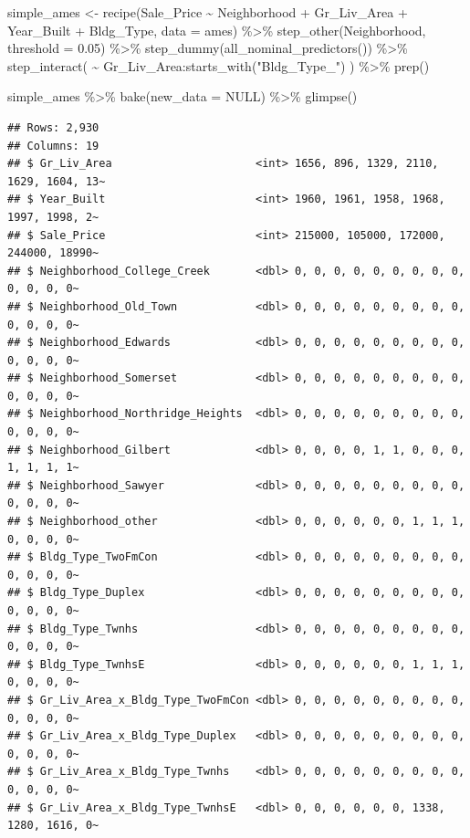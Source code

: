 \documentclass[
]{book}
\newenvironment{Shaded}{\begin{snugshade}}{\end{snugshade}}
\newcommand{\AttributeTok}[1]{\textcolor[rgb]{0.77,0.63,0.00}{#1}}
\newcommand{\ConstantTok}[1]{\textcolor[rgb]{0.00,0.00,0.00}{#1}}
\newcommand{\FloatTok}[1]{\textcolor[rgb]{0.00,0.00,0.81}{#1}}
\newcommand{\FunctionTok}[1]{\textcolor[rgb]{0.00,0.00,0.00}{#1}}
\newcommand{\NormalTok}[1]{#1}
\newcommand{\OtherTok}[1]{\textcolor[rgb]{0.56,0.35,0.01}{#1}}
\newcommand{\SpecialCharTok}[1]{\textcolor[rgb]{0.00,0.00,0.00}{#1}}
\newcommand{\StringTok}[1]{\textcolor[rgb]{0.31,0.60,0.02}{#1}}
\begin{document}
\begin{Shaded}
\begin{Highlighting}[]
\NormalTok{simple\_ames }\OtherTok{\textless{}{-}} \FunctionTok{recipe}\NormalTok{(Sale\_Price }\SpecialCharTok{\textasciitilde{}}\NormalTok{ Neighborhood }\SpecialCharTok{+}\NormalTok{ Gr\_Liv\_Area }\SpecialCharTok{+}\NormalTok{ Year\_Built }\SpecialCharTok{+}\NormalTok{ Bldg\_Type,}
         \AttributeTok{data =}\NormalTok{ ames) }\SpecialCharTok{\%\textgreater{}\%}
  \FunctionTok{step\_other}\NormalTok{(Neighborhood, }\AttributeTok{threshold =} \FloatTok{0.05}\NormalTok{) }\SpecialCharTok{\%\textgreater{}\%} 
  \FunctionTok{step\_dummy}\NormalTok{(}\FunctionTok{all\_nominal\_predictors}\NormalTok{()) }\SpecialCharTok{\%\textgreater{}\%} 
  \FunctionTok{step\_interact}\NormalTok{( }\SpecialCharTok{\textasciitilde{}}\NormalTok{ Gr\_Liv\_Area}\SpecialCharTok{:}\FunctionTok{starts\_with}\NormalTok{(}\StringTok{"Bldg\_Type\_"}\NormalTok{) ) }\SpecialCharTok{\%\textgreater{}\%} 
  \FunctionTok{prep}\NormalTok{()}

\NormalTok{simple\_ames }\SpecialCharTok{\%\textgreater{}\%} \FunctionTok{bake}\NormalTok{(}\AttributeTok{new\_data =} \ConstantTok{NULL}\NormalTok{) }\SpecialCharTok{\%\textgreater{}\%} \FunctionTok{glimpse}\NormalTok{()}
\end{Highlighting}
\end{Shaded}

\begin{verbatim}
## Rows: 2,930
## Columns: 19
## $ Gr_Liv_Area                      <int> 1656, 896, 1329, 2110, 1629, 1604, 13~
## $ Year_Built                       <int> 1960, 1961, 1958, 1968, 1997, 1998, 2~
## $ Sale_Price                       <int> 215000, 105000, 172000, 244000, 18990~
## $ Neighborhood_College_Creek       <dbl> 0, 0, 0, 0, 0, 0, 0, 0, 0, 0, 0, 0, 0~
## $ Neighborhood_Old_Town            <dbl> 0, 0, 0, 0, 0, 0, 0, 0, 0, 0, 0, 0, 0~
## $ Neighborhood_Edwards             <dbl> 0, 0, 0, 0, 0, 0, 0, 0, 0, 0, 0, 0, 0~
## $ Neighborhood_Somerset            <dbl> 0, 0, 0, 0, 0, 0, 0, 0, 0, 0, 0, 0, 0~
## $ Neighborhood_Northridge_Heights  <dbl> 0, 0, 0, 0, 0, 0, 0, 0, 0, 0, 0, 0, 0~
## $ Neighborhood_Gilbert             <dbl> 0, 0, 0, 0, 1, 1, 0, 0, 0, 1, 1, 1, 1~
## $ Neighborhood_Sawyer              <dbl> 0, 0, 0, 0, 0, 0, 0, 0, 0, 0, 0, 0, 0~
## $ Neighborhood_other               <dbl> 0, 0, 0, 0, 0, 0, 1, 1, 1, 0, 0, 0, 0~
## $ Bldg_Type_TwoFmCon               <dbl> 0, 0, 0, 0, 0, 0, 0, 0, 0, 0, 0, 0, 0~
## $ Bldg_Type_Duplex                 <dbl> 0, 0, 0, 0, 0, 0, 0, 0, 0, 0, 0, 0, 0~
## $ Bldg_Type_Twnhs                  <dbl> 0, 0, 0, 0, 0, 0, 0, 0, 0, 0, 0, 0, 0~
## $ Bldg_Type_TwnhsE                 <dbl> 0, 0, 0, 0, 0, 0, 1, 1, 1, 0, 0, 0, 0~
## $ Gr_Liv_Area_x_Bldg_Type_TwoFmCon <dbl> 0, 0, 0, 0, 0, 0, 0, 0, 0, 0, 0, 0, 0~
## $ Gr_Liv_Area_x_Bldg_Type_Duplex   <dbl> 0, 0, 0, 0, 0, 0, 0, 0, 0, 0, 0, 0, 0~
## $ Gr_Liv_Area_x_Bldg_Type_Twnhs    <dbl> 0, 0, 0, 0, 0, 0, 0, 0, 0, 0, 0, 0, 0~
## $ Gr_Liv_Area_x_Bldg_Type_TwnhsE   <dbl> 0, 0, 0, 0, 0, 0, 1338, 1280, 1616, 0~
\end{verbatim}
\end{document}
